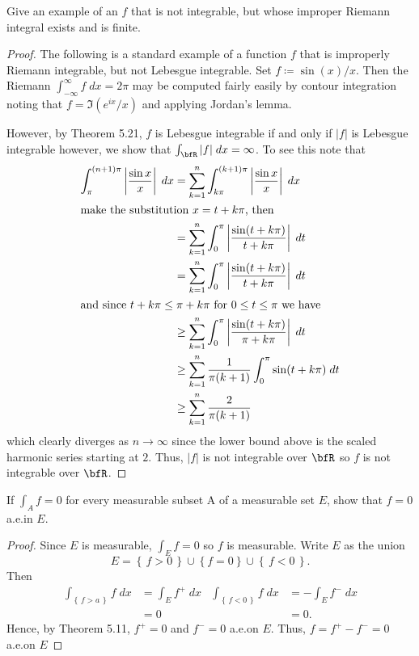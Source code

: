 \begin{problem}
Give an example of an $f$ that is not integrable, but whose improper
Riemann integral exists and is finite.
\end{problem}
\begin{proof}
The following is a standard example of a function $f$ that is improperly
Riemann integrable, but not Lebesgue integrable. Set $f\coloneqq
\sin(x)/x$. Then the Riemann $\int_{-\infty}^\infty f\;dx=2\pi$ may be computed
fairly easily by contour integration noting that
$f=\Im\left(e^{ix}/x\right)$ and applying Jordan's lemma.

However, by Theorem 5.21, $f$ is Lebesgue integrable if and only if $|f|$
is Lebesgue integrable however, we show that
$\int_{\bfR}|f|\;dx=\infty$. To see this note that
\begin{align*}
\int_{\pi}^{(n+1)\pi}\left|\frac{\sin x}{x}\right|\;dx
&=\sum_{k=1}^n\int_{k\pi}^{(k+1)\pi}\left|\frac{\sin x}{x}\right|\;dx\\
\intertext{make the substitution $x=t+k\pi$, then}
&=\sum_{k=1}^n\int_0^\pi\left|\frac{\sin(t+k\pi)}{t+k\pi}\right|\;dt\\
&=\sum_{k=1}^n\int_0^\pi\left|\frac{\sin(t+k\pi)}{t+k\pi}\right|\;dt\\
\intertext{and since $t+k\pi\leq \pi+k\pi$ for $0\leq t\leq\pi$ we have}
&\geq\sum_{k=1}^n\int_0^\pi\left|\frac{\sin(t+k\pi)}{\pi+k\pi}\right|\;dt\\
&\geq\sum_{k=1}^n\frac{1}{\pi(k+1)}\int_0^\pi\sin(t+k\pi)\;dt\\
&\geq\sum_{k=1}^n\frac{2}{\pi(k+1)}
\end{align*}
which clearly diverges as $n\to\infty$ since the lower bound above is the
scaled harmonic series starting at $2$. Thus, $|f|$ is not integrable over
$\bfR$ so $f$ is not integrable over $\bfR$.
\end{proof}
\newpage

\begin{problem}
If $\int_A f=0$ for every measurable subset A of a measurable set $E$, show
that $f=0$ a.e.\@ in $E$.
\end{problem}
\begin{proof}
Since $E$ is measurable, $\int_E f=0$ so $f$ is measurable. Write $E$ as
the union
\begin{equation}
\label{eq:rewrite-e}
E=\left\{\,f>0\,\right\}\cup\left\{f=0\right\}\cup\left\{\,f<0\,\right\}.
\end{equation}
Then
\begin{align*}
\int_{\left\{\,f>a\,\right\}}f\;dx&=\int_Ef^+\;dx&
\int_{\left\{\,f<0\,\right\}}f\;dx&=-\int_Ef^-\;dx\\
&=0&&=0.
\end{align*}
Hence, by Theorem 5.11, $f^+=0$ and $f^-=0$ a.e.\@ on $E$. Thus,
$f=f^+-f^-=0$ a.e.\@ on $E$
\end{proof}
\newpage

